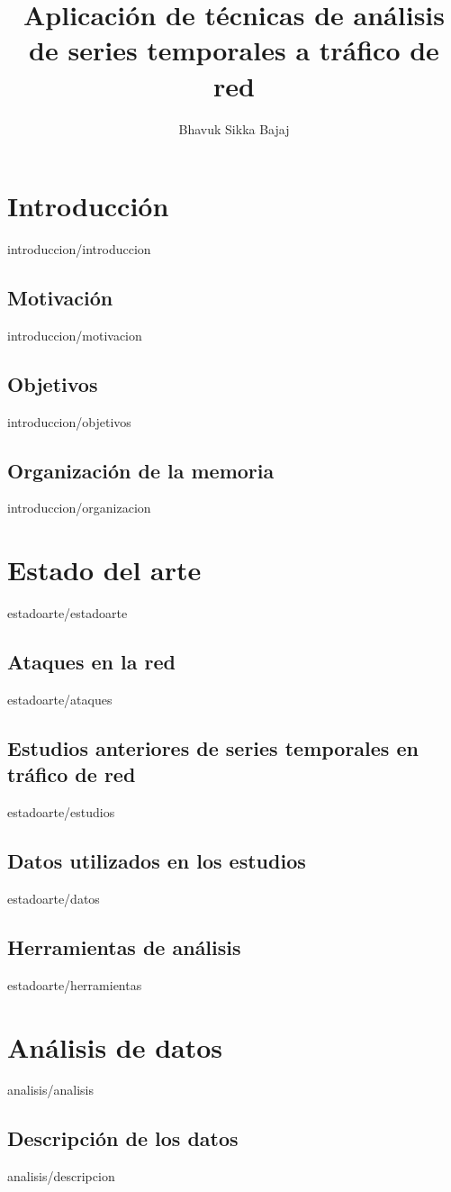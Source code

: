 \documentclass[epsbased,copyright,final,printable,covers,extendedindex,firstnumbered,tfg,gnuplot]{tfgtfmthesisuam}
\title{Aplicación de técnicas de análisis de series temporales a tráfico de red}
\author{Bhavuk Sikka Bajaj}
\begin{document}
\chapter{Introducción\label{CAP:INTRODUCCION}}{introduccion/introduccion}
  \section{Motivación\label{SEC:MOTIVACION}}{introduccion/motivacion}
  \section{Objetivos\label{SEC:OBJETIVOS}}{introduccion/objetivos}
  \section{Organización de la memoria\label{SEC:ORGANIZACION}}{introduccion/organizacion}

\chapter{Estado del arte\label{CAP:ESTADOARTE}}{estadoarte/estadoarte}
  \section{Ataques en la red\label{SEC:ATAQUES}}{estadoarte/ataques}
  \section{Estudios anteriores de series temporales en tráfico de red\label{SEC:ESTUDIOS}}{estadoarte/estudios}
  \section{Datos utilizados en los estudios\label{SEC:DATOS}}{estadoarte/datos}
  \section{Herramientas de análisis\label{SEC:HERRAMIENTAS}}{estadoarte/herramientas}

\chapter{Análisis de datos\label{CAP:ANALISIS}}{analisis/analisis}
  \section{Descripción de los datos\label{SEC:DESCRIPCION}}{analisis/descripcion}
\end{document}
